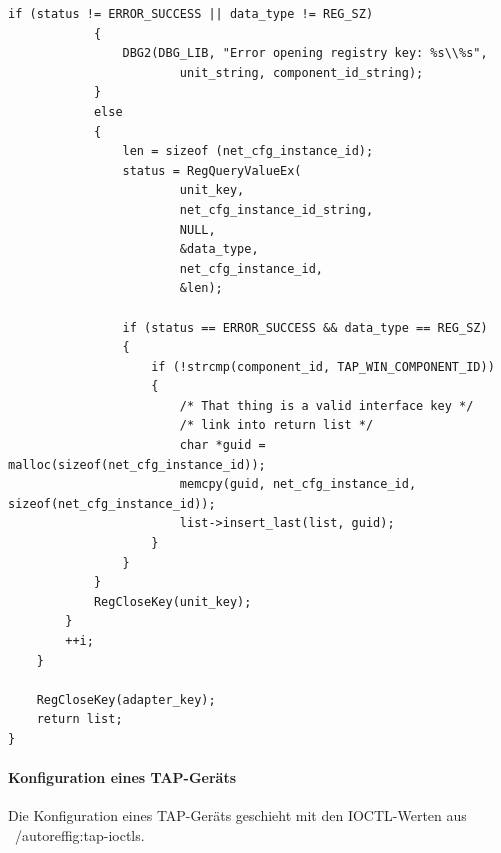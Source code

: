 \begin{lstlisting}[caption=Code für das Suchen eines TAP-Geräts]
            if (status != ERROR_SUCCESS || data_type != REG_SZ)
            {
                DBG2(DBG_LIB, "Error opening registry key: %s\\%s",
                        unit_string, component_id_string);
            }
            else
            {
                len = sizeof (net_cfg_instance_id);
                status = RegQueryValueEx(
                        unit_key,
                        net_cfg_instance_id_string,
                        NULL,
                        &data_type,
                        net_cfg_instance_id,
                        &len);

                if (status == ERROR_SUCCESS && data_type == REG_SZ)
                {
                    if (!strcmp(component_id, TAP_WIN_COMPONENT_ID))
                    {
                        /* That thing is a valid interface key */
                        /* link into return list */
                        char *guid = malloc(sizeof(net_cfg_instance_id));
                        memcpy(guid, net_cfg_instance_id, sizeof(net_cfg_instance_id));
                        list->insert_last(list, guid);
                    }
                }
            }
            RegCloseKey(unit_key);
        }
        ++i;
    }

    RegCloseKey(adapter_key);
    return list;
}
\end{lstlisting}

\paragraph{Konfiguration eines TAP-Geräts}
Die Konfiguration eines TAP-Geräts geschieht mit den IOCTL-Werten aus ~/autoref{fig:tap-ioctls}.

